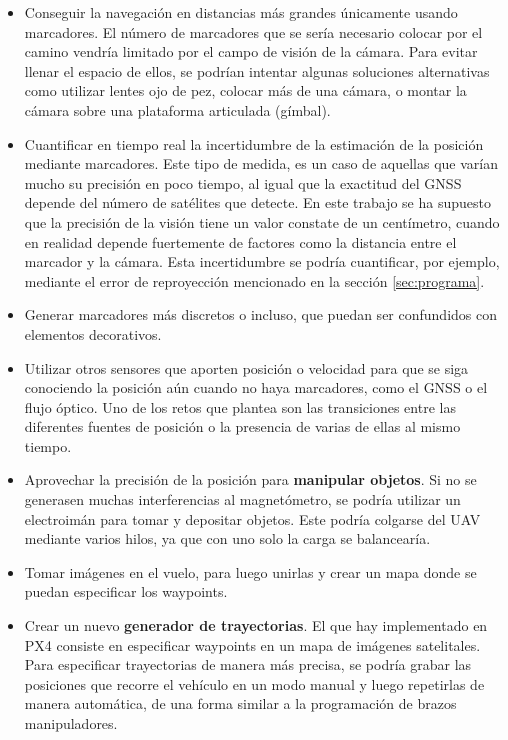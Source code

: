 	\begin{itemize}
	\item Conseguir la navegación en distancias más grandes únicamente usando marcadores. El número de marcadores que se sería necesario colocar por el camino vendría limitado por el campo de visión de la cámara. Para evitar llenar el espacio de ellos, se podrían intentar algunas soluciones alternativas como utilizar lentes ojo de pez, colocar más de una cámara, o montar la cámara sobre una plataforma articulada (gímbal).    


	\item Cuantificar en tiempo real la incertidumbre de la estimación de la posición mediante marcadores. Este tipo de medida, es un caso de aquellas que varían mucho su precisión en poco tiempo, al igual que la exactitud del GNSS depende del número de satélites que detecte. En este trabajo se ha supuesto que la precisión de la visión tiene un valor constate de un centímetro, cuando en realidad depende fuertemente de factores como la distancia entre el marcador y la cámara. Esta incertidumbre se podría cuantificar, por ejemplo, mediante el error de reproyección mencionado en la sección \ref{sec:programa}.

	\item Generar marcadores más discretos o incluso, que puedan ser confundidos con elementos decorativos.

	\item Utilizar otros sensores que aporten posición o velocidad para que se siga conociendo la posición aún cuando no haya marcadores, como el GNSS o el flujo óptico. Uno de los retos que plantea son las transiciones entre las diferentes fuentes de posición o la presencia de varias de ellas al mismo tiempo. 

	\item Aprovechar la precisión de la posición para \textbf{manipular objetos}. Si no se generasen muchas interferencias al magnetómetro, se podría utilizar un electroimán para tomar y depositar objetos. Este podría colgarse del UAV mediante varios hilos, ya que con uno solo la carga se balancearía. 

	\item Tomar imágenes en el vuelo, para luego unirlas y crear un mapa donde se puedan especificar los waypoints. 

	\item Crear un nuevo \textbf{generador de trayectorias}. El que hay implementado en PX4 consiste en especificar waypoints en un mapa de imágenes satelitales. Para especificar trayectorias de manera más precisa, se podría grabar las posiciones que recorre el vehículo en un modo manual y luego repetirlas de manera automática, de una forma similar a la programación de brazos manipuladores.  
	\end{itemize}


\endinput

